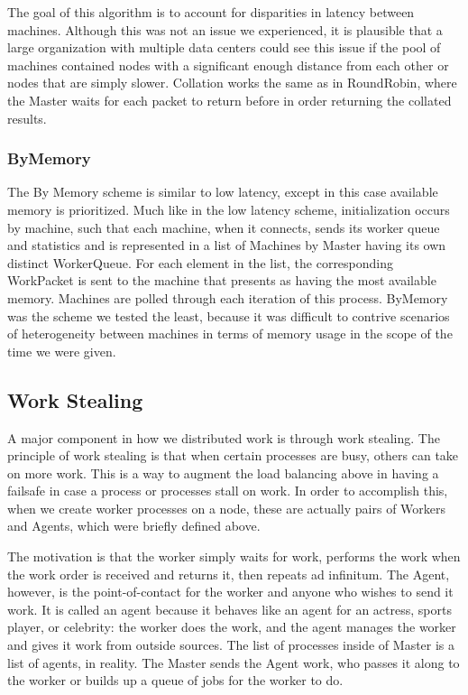 \documentclass[letterpaper,twocolumn,10pt]{article}
\begin{document}
The goal of this algorithm is to account for disparities in latency between
machines. Although this was not an issue we experienced, it is plausible that a
large organization with multiple data centers could see this issue if the pool
of machines contained nodes with a significant enough distance from each other
or nodes that are simply slower. Collation works the same as in RoundRobin,
where the Master waits for each packet to return before in order returning the
collated results.

\subsubsection{ByMemory}

The By Memory scheme is similar to low latency, except in this case available
memory is prioritized. Much like in the low latency scheme, initialization
occurs by machine, such that each machine, when it connects, sends its worker
queue and statistics and is represented in a list of Machines by Master having
its own distinct WorkerQueue. For each element in the list, the corresponding
WorkPacket is sent to the machine that presents as having the most available
memory. Machines are polled through each iteration of this process. ByMemory
was the scheme we tested the least, because it was difficult to contrive
scenarios of heterogeneity between machines in terms of memory usage in the
scope of the time we were given.

\subsection{Work Stealing}

A major component in how we distributed work is through work stealing. The
principle of work stealing is that when certain processes are busy, others can
take on more work. This is a way to augment the load balancing above in having
a failsafe in case a process or processes stall on work. In order to accomplish
this, when we create worker processes on a node, these are actually pairs of
Workers and Agents, which were briefly defined above.

The motivation is that the worker simply waits for work, performs the work when
the work order is received and returns it, then repeats ad infinitum. The
Agent, however, is the point-of-contact for the worker and anyone who wishes to
send it work. It is called an agent because it behaves like an agent for an
actress, sports player, or celebrity: the worker does the work, and the agent
manages the worker and gives it work from outside sources. The list of
processes inside of Master is a list of agents, in reality. The Master sends
the Agent work, who passes it along to the worker or builds up a queue of jobs
for the worker to do.
\end{document}
